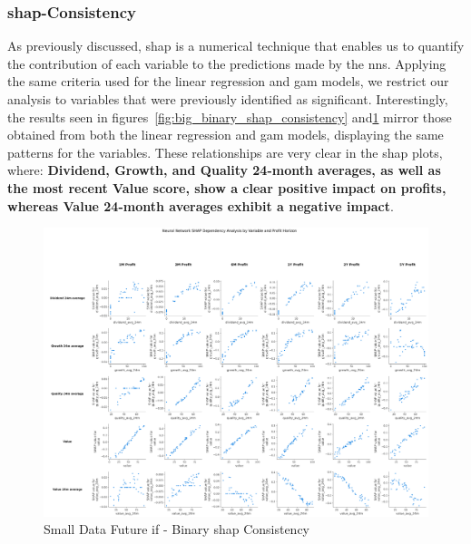 \documentclass[11pt,english,a4paper,hidelinks]{book}
\begin{document}
\subsubsection{\acrshort{shap}-Consistency}

\noindent As previously discussed, \gls{shap} is a numerical technique that enables us to quantify the contribution of each variable to the predictions made by the \acrshort{nn}s. Applying the same criteria used for the linear regression and \acrshort{gam} models, we restrict our analysis to variables that were previously identified as significant. Interestingly, the results seen in figures~\ref{fig:big_binary_shap_consistency} and\ref{fig:small_binary_shap_consistency} mirror those obtained from both the linear regression and \acrshort{gam} models, displaying the same patterns for the variables. These relationships are very clear in the \acrshort{shap} plots, where: \textbf{Dividend, Growth, and Quality 24-month averages, as well as the most recent Value score, show a clear positive impact on profits, whereas Value 24-month averages exhibit a negative impact}.

\begin{figure}[H]
    \centering
    \includegraphics[width=1\textwidth]{images/code/models/neural_network/binary_classifier_nn/Small Test - IF/shap_table_analysis.png}
    \caption{Small Data Future \acrshort{if} - Binary \gls{shap} Consistency}
    \label{fig:small_binary_shap_consistency}
\end{figure}
\end{document}
